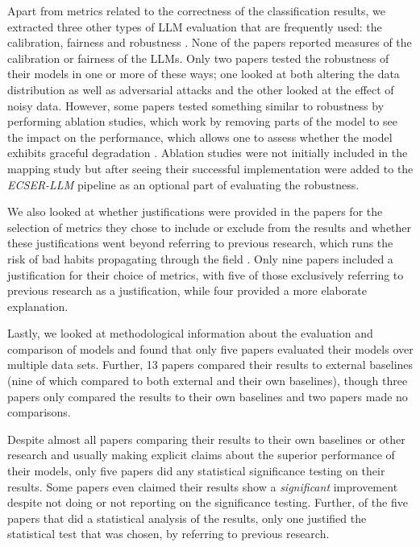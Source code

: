 \documentclass[a4paper]{article}
\newcommand{\newecser}{\textit{ECSER-LLM} }
\begin{document}
Apart from metrics related to the correctness of the classification results, we extracted three other types of LLM evaluation that are frequently used: the calibration, fairness and robustness \cite{chang2023}. None of the papers reported measures of the calibration or fairness of the LLMs.  Only two papers tested the robustness of their models in one or more of these ways; one looked at both altering the data distribution as well as adversarial attacks and the other looked at the effect of noisy data. However, some papers tested something similar to robustness by performing ablation studies, which work by removing parts of the model to see the impact on the performance, which allows one to assess whether the model exhibits graceful degradation \cite{meyes2019ablation}. Ablation studies were not initially included in the mapping study but after seeing their successful implementation were added to the \newecser pipeline as an optional part of evaluating the robustness.


We also looked at whether justifications were provided in the papers for the selection of metrics they chose to include or exclude from the results and whether these justifications went beyond referring to previous research, which runs the risk of bad habits propagating through the field \cite{Dellanna2022}. Only nine papers included a justification for their choice of metrics, with five of those exclusively referring to previous research as a justification, while four provided a more elaborate explanation.

Lastly, we looked at methodological information about the evaluation and comparison of models and found that only five papers evaluated their models over multiple data sets. Further, 13 papers compared their results to external baselines (nine of which compared to both external and their own baselines), though three papers only compared the results to their own baselines and two papers made no comparisons. 

Despite almost all papers comparing their results to their own baselines or other research and usually making explicit claims about the superior performance of their models, only five papers did any statistical significance testing on their results. Some papers even claimed their results show a \textit{significant} improvement despite not doing or not reporting on the significance testing. Further, of the five papers that did a statistical analysis of the results, only one justified the statistical test that was chosen, by referring to previous research. 
\end{document}
